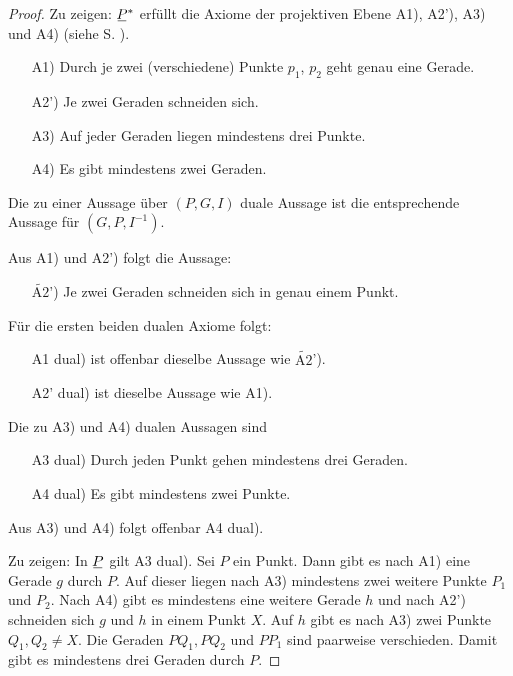 \begin{proof}
 Zu zeigen: $\proj^*$ erfüllt die Axiome der projektiven Ebene A1), A2'), A3) und A4) (siehe S. \pageref{def:proj}).
 \begin{enumerate}[\hspace{.5cm}A2)]
  \item[A1)] Durch je zwei (verschiedene) Punkte $p_1$, $p_2$ geht genau eine Gerade.
  \item[A2')] Je zwei Geraden schneiden sich.
  \item[A3)] Auf jeder Geraden liegen mindestens drei Punkte.
  \item[A4)] Es gibt mindestens zwei Geraden.
 \end{enumerate}
 
 Die zu einer Aussage über $(P,G,I)$ duale Aussage ist die entsprechende Aussage für $(G,P,I^{-1})$\footnotemark.
 
 Aus A1) und A2') folgt die Aussage:
 \begin{enumerate}[\hspace{.5cm}A2)]
  \item [$\widetilde{\text{A2}}$')] Je zwei Geraden schneiden sich in genau einem Punkt.
 \end{enumerate}

 Für die ersten beiden dualen Axiome folgt:
 \begin{enumerate}
  \item[A1 dual)] ist offenbar dieselbe Aussage wie $\widetilde{\text{A2}}$').
  \item[A2' dual)] ist dieselbe Aussage wie A1).
 \end{enumerate}

 Die zu A3) und A4) dualen Aussagen sind
 \begin{enumerate}
  \item[A3 dual)] Durch jeden Punkt gehen mindestens drei Geraden.
  \item[A4 dual)] Es gibt mindestens zwei Punkte.
 \end{enumerate}
 Aus A3) und A4) folgt offenbar A4 dual). 
 
 Zu zeigen: In $\proj$ gilt A3 dual). Sei $P$ ein Punkt. Dann gibt es nach A1) eine Gerade $g$ durch $P$.  Auf dieser liegen nach A3) mindestens zwei weitere Punkte $P_1$ und $P_2$. Nach A4) gibt es mindestens eine weitere Gerade $h$ und nach A2') schneiden sich $g$ und $h$ in einem Punkt $X$. Auf $h$ gibt es nach A3) zwei Punkte $Q_1, Q_2 \ne X$. Die Geraden $PQ_1, PQ_2$ und $PP_1$ sind paarweise verschieden. Damit gibt es mindestens drei Geraden durch $P$.
\end{proof}

